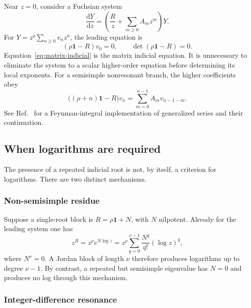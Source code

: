 \documentclass[11pt]{article}
\newcommand{\dd}{\mathrm d}
\newcommand{\Id}{\mathbf 1}
\renewcommand{\_}{\origunderscore\allowbreak}
\begin{document}
Near $z=0$, consider a Fuchsian system
\begin{equation}
  \frac{\dd Y}{\dd z}
  =\left(\frac{R}{z}+\sum_{m\geq0}A_m z^m\right)Y.
  \label{eq:fuchsian-system}
\end{equation}
For $Y=z^\rho\sum_{n\geq0}v_nz^n$, the leading equation is
\begin{equation}
  (\rho\Id-R)v_0=0,
  \qquad
  \det(\rho\Id-R)=0.
  \label{eq:matrix-indicial}
\end{equation}
Equation~\eqref{eq:matrix-indicial} is the matrix indicial equation.  It is unnecessary to
eliminate the system to a scalar higher-order equation before determining its local
exponents.  For a semisimple nonresonant branch, the higher coefficients obey
\begin{equation}
  \bigl((\rho+n)\Id-R\bigr)v_n
  =\sum_{m=0}^{n-1}A_m v_{n-1-m}.
  \label{eq:frobenius-recurrence}
\end{equation}
See Ref.~\cite{Moriello:2019yhu} for a Feynman-integral implementation of generalized
series and their continuation.

\subsection{When logarithms are required}
\label{subsec:log}

The presence of a repeated indicial root is not, by itself, a criterion for logarithms.
There are two distinct mechanisms.

\subsubsection{Non-semisimple residue}

Suppose a single-root block is $R=\rho\Id+N$, with $N$ nilpotent.  Already for the leading
system one has
\begin{equation}
  z^R=z^\rho e^{N\log z}
  =z^\rho\sum_{q=0}^{\nu-1}\frac{N^q}{q!}(\log z)^q,
  \label{eq:jordan-log}
\end{equation}
where $N^\nu=0$.  A Jordan block of length $\nu$ therefore produces logarithms up to degree
$\nu-1$.  By contrast, a repeated but semisimple eigenvalue has $N=0$ and produces no log
through this mechanism.

\subsubsection{Integer-difference resonance}
\end{document}
